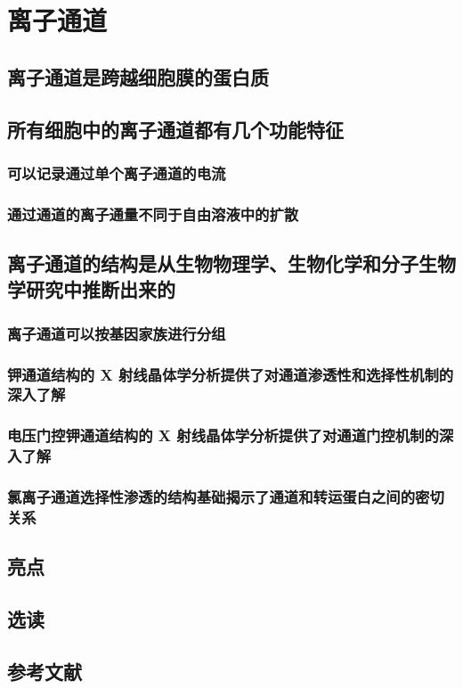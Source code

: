 \chapter{离子通道}

\section{离子通道是跨越细胞膜的蛋白质}

\section{所有细胞中的离子通道都有几个功能特征}
\subsection{可以记录通过单个离子通道的电流}
\subsection{通过通道的离子通量不同于自由溶液中的扩散}

\section{离子通道的结构是从生物物理学、生物化学和分子生物学研究中推断出来的}
\subsection{离子通道可以按基因家族进行分组}
\subsection{钾通道结构的 X 射线晶体学分析提供了对通道渗透性和选择性机制的深入了解}
\subsection{电压门控钾通道结构的 X 射线晶体学分析提供了对通道门控机制的深入了解}
\subsection{氯离子通道选择性渗透的结构基础揭示了通道和转运蛋白之间的密切关系}

\section{亮点}

\section{选读}

\section{参考文献}
